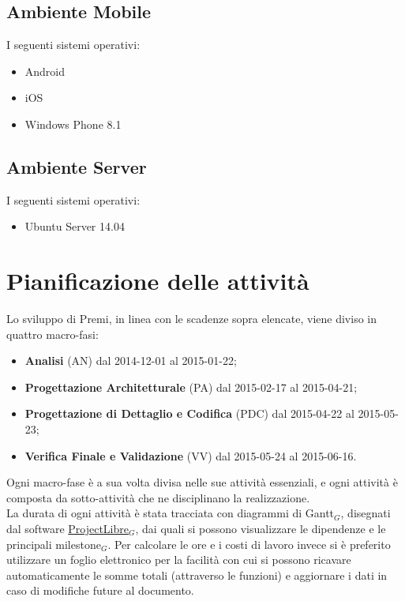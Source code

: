 \subsection{Ambiente Mobile}
I seguenti sistemi operativi:
\begin{itemize}
\item Android
\item iOS
\item Windows Phone 8.1
\end{itemize}

\subsection{Ambiente Server}
I seguenti sistemi operativi:
\begin{itemize}
\item Ubuntu Server 14.04
\end{itemize}



\newpage
\section{Pianificazione delle attività}
Lo sviluppo di Premi, in linea con le scadenze sopra elencate, viene diviso in quattro macro-fasi:

\begin{itemize}
\item \textbf{Analisi} (AN) dal 2014-12-01 al 2015-01-22;
\item \textbf{Progettazione Architetturale} (PA) dal 2015-02-17 al 2015-04-21;
\item \textbf{Progettazione di Dettaglio e Codifica} (PDC) dal 2015-04-22 al 2015-05-23;
\item \textbf{Verifica Finale e Validazione} (VV) dal 2015-05-24 al 2015-06-16.
\end{itemize}
Ogni macro-fase è a sua volta divisa nelle sue attività essenziali, e ogni attività è composta da sotto-attività che ne disciplinano la realizzazione.\\
La durata di ogni attività è stata tracciata con diagrammi di Gantt$_{G}$, disegnati dal software \href{http://www.projectlibre.org/}{ProjectLibre}$_{G}$, dai quali si possono visualizzare le dipendenze e le principali milestone$_{G}$. Per calcolare le ore e i costi di lavoro invece si è preferito utilizzare un foglio elettronico per la facilità con cui si possono ricavare automaticamente le somme totali (attraverso le funzioni) e aggiornare i dati in caso di modifiche future al documento.

